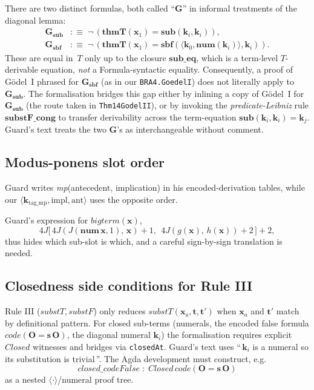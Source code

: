 \documentclass[11pt]{article}
\theoremstyle{plain}
\theoremstyle{definition}
\theoremstyle{remark}
\newcommand{\code}[1]{\mathit{code}(#1)}
\newcommand{\sub}{\mathbf{sub}}
\newcommand{\sbf}{\mathbf{sbf}}
\newcommand{\thmT}{\mathbf{thmT}}
\newcommand{\num}{\mathbf{num}}
\newcommand{\seq}[1]{\langle #1 \rangle}
\newcommand{\Closed}{\mathit{Closed}}
\newcommand{\substT}{\mathit{substT}}
\newcommand{\substF}{\mathit{substF}}
\begin{document}
There are two distinct formulas, both called ``$\mathbf{G}$'' in
informal treatments of the diagonal lemma:
\begin{align*}
\mathbf{G}_{\sub}  &:\equiv\; \neg\,(\thmT(\mathbf{x}_1) = \sub(\mathbf{k}_i, \mathbf{k}_i)), \\
\mathbf{G}_{\sbf}  &:\equiv\; \neg\,(\thmT(\mathbf{x}_1) = \sbf(\seq{\mathbf{k}_0, \num(\mathbf{k}_i)}, \mathbf{k}_i)).
\end{align*}
These are equal in~$T$ only up to the closure $\mathbf{sub\_eq}$,
which is a term-level $T$-derivable equation, \emph{not} a
Formula-syntactic equality.  Consequently, a proof of G\"odel~I phrased
for $\mathbf{G}_{\sbf}$ (as in our \verb|BRA4.GoedelI|) does not
literally apply to $\mathbf{G}_{\sub}$.  The formalisation bridges this
gap either by inlining a copy of G\"odel~I for $\mathbf{G}_{\sub}$ (the
route taken in \verb|Thm14GodelII|), or by invoking the
\emph{predicate-Leibniz} rule $\mathbf{substF\_cong}$ to transfer
derivability across the term-equation $\sub(\mathbf{k}_i, \mathbf{k}_i)
= \mathbf{k}_j$.  Guard's text treats the two $\mathbf{G}$'s as
interchangeable without comment.

\subsection{Modus-ponens slot order}

{\sloppy Guard writes \emph{mp}(antecedent, implication) in
his encoded-derivation tables, while our
$\seq{\mathbf{k}_{\mathrm{tag\_mp}}, \mathrm{impl}, \mathrm{ant}}$ uses
the opposite order.\par}  Guard's expression for
$\mathit{bigterm}(\mathbf{x})$,
\[
4J\bigl[\,4J(J(\num\,\mathbf{x},1),\, \mathbf{x})+1,\ \ 4J(g(\mathbf{x}),\, h(\mathbf{x}))+2\,\bigr]+2,
\]
thus hides which sub-slot is which, and a careful sign-by-sign
translation is needed.

\subsection{Closedness side conditions for Rule III}

Rule III ($\substT, \substF$) only reduces $\substT(\mathbf{x}_a,
\mathbf{t}, \mathbf{t}')$ when $\mathbf{x}_a$ and $\mathbf{t}'$ match
by definitional pattern.  For closed sub-terms (numerals, the encoded
false formula $\code{\mathbf{O} = \mathbf{s}\,\mathbf{O}}$, the
diagonal numeral $\mathbf{k}_i$) the formalisation requires explicit
$\Closed$ witnesses and bridges via \texttt{closedAt}.  Guard's text
uses ``\,$\mathbf{k}_i$ is a numeral so its substitution is
trivial\,''.  The Agda development must construct, e.g.\
\[
\mathit{closed\_codeFalse} \;:\; \Closed\,\code{\mathbf{O} = \mathbf{s}\,\mathbf{O}}
\]
as a nested $\seq{\cdot}$/numeral proof tree.
\end{document}
